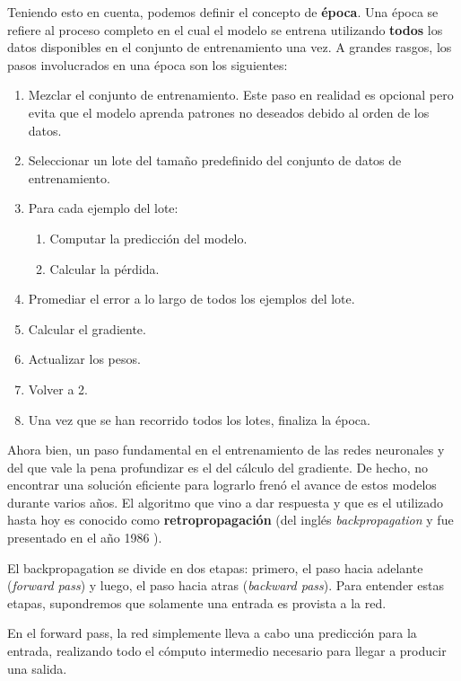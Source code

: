 \documentclass[../../main.tex]{subfiles}
\begin{document}

Teniendo esto en cuenta, podemos definir el concepto de \textbf{época}. Una época se
refiere al proceso completo en el cual el modelo se entrena utilizando \textbf{todos} los
datos disponibles en el conjunto de entrenamiento una vez. A grandes rasgos, los pasos
involucrados en una época son los siguientes:
\begin{enumerate}[itemsep=0.05cm]
    \item Mezclar el conjunto de entrenamiento. Este paso en realidad es opcional
    pero evita que el modelo aprenda patrones no deseados debido al orden de los datos.
    \item Seleccionar un lote del tamaño predefinido del conjunto de datos de entrenamiento.
    \item Para cada ejemplo del lote:
    \vspace{-0.2cm}
    \begin{enumerate}[noitemsep]
        \item Computar la predicción del modelo.
        \item Calcular la pérdida.
    \end{enumerate}
    \item Promediar el error a lo largo de todos los ejemplos del lote.
    \item Calcular el gradiente.
    \item Actualizar los pesos.
    \item Volver a 2.
    \item Una vez que se han recorrido todos los lotes, finaliza la época.
\end{enumerate}

Ahora bien, un paso fundamental en el entrenamiento de las redes neuronales y del que vale
la pena profundizar es el del cálculo del gradiente. De hecho, no encontrar una solución
eficiente para lograrlo frenó el avance de estos modelos durante varios años. El algoritmo
que vino a dar respuesta y que es el utilizado hasta hoy es conocido como
\textbf{retropropagación} (del inglés \textit{backpropagation} y fue presentado en el año
1986 \cite{backprop-1986}).

El backpropagation se divide en dos etapas: primero, el paso hacia adelante
(\textit{forward pass}) y luego, el paso hacia atras (\textit{backward pass}).
Para entender estas etapas, supondremos que solamente una entrada es provista a
la red.

En el forward pass, la red simplemente lleva a cabo una predicción para la entrada,
realizando todo el cómputo intermedio necesario para llegar a producir una salida.
\end{document}
